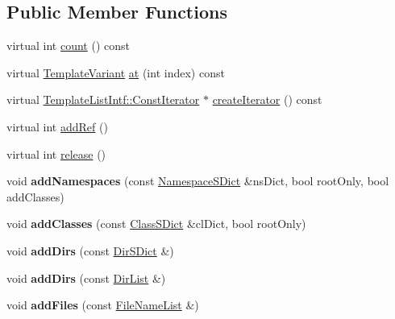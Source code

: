 \subsection*{Public Member Functions}
\begin{DoxyCompactItemize}
\item 
virtual int \mbox{\hyperlink{class_nesting_context_a71527fdcb3f4537999d866728480c1d4}{count}} () const
\item 
virtual \mbox{\hyperlink{class_template_variant}{Template\+Variant}} \mbox{\hyperlink{class_nesting_context_a11ff5ba22637b6ce76883c3cb840e67b}{at}} (int index) const
\item 
virtual \mbox{\hyperlink{class_template_list_intf_1_1_const_iterator}{Template\+List\+Intf\+::\+Const\+Iterator}} $\ast$ \mbox{\hyperlink{class_nesting_context_ab263d1be16f2bfe1e094166a31b4a912}{create\+Iterator}} () const
\item 
virtual int \mbox{\hyperlink{class_nesting_context_a71b0b342e5bb1b434a0390a77640df55}{add\+Ref}} ()
\item 
virtual int \mbox{\hyperlink{class_nesting_context_a4f43acface7c31d6bb2aa3d9a9f2ea13}{release}} ()
\item 
\mbox{\label{class_nesting_context_a0f51902303237dea662f7773633d1833}} 
void {\bfseries add\+Namespaces} (const \mbox{\hyperlink{class_namespace_s_dict}{Namespace\+S\+Dict}} \&ns\+Dict, bool root\+Only, bool add\+Classes)
\item 
\mbox{\label{class_nesting_context_ae520871daeb0cf070443873fefc2c3ed}} 
void {\bfseries add\+Classes} (const \mbox{\hyperlink{class_class_s_dict}{Class\+S\+Dict}} \&cl\+Dict, bool root\+Only)
\item 
\mbox{\label{class_nesting_context_a9ad1a2be0df92986ce455d836f9b72f0}} 
void {\bfseries add\+Dirs} (const \mbox{\hyperlink{class_dir_s_dict}{Dir\+S\+Dict}} \&)
\item 
\mbox{\label{class_nesting_context_a512b12070aa7042bd1d21b75d5393897}} 
void {\bfseries add\+Dirs} (const \mbox{\hyperlink{class_dir_list}{Dir\+List}} \&)
\item 
\mbox{\label{class_nesting_context_adda61f73cae330126a7172393797c6df}} 
void {\bfseries add\+Files} (const \mbox{\hyperlink{class_file_name_list}{File\+Name\+List}} \&)

\end{DoxyCompactItemize}
